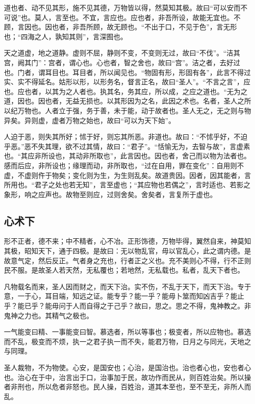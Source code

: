 \documentclass[]{article}
\begin{document}
道也者、动不见其形，施不见其德，万物皆以得，然莫知其极。故曰``可以安而不可说''也。莫人，言至也。不宜，言应也。应也者，非吾所设，故能无宜也。不顾，言因也。因也者，非吾所顾，故无顾也。``不出于口，不见于色''，言无形也；``四海之人，孰知其则''，言深囿也。

天之道虚，地之道静。虚则不屈，静则不变，不变则无过，故曰``不伐''。``洁其宫，阙其门''：宫者，谓心也。心也者，智之舍也，故曰``宫''。洁之者，去好过也。门者，谓耳目也。耳目者，所以闻见也。``物固有形，形固有各''，此言不得过实、实不得延名。姑形以形，以形务名，督言正名，故曰``圣人''。``不言之言''，应也。应也者，以其为之人者也。执其名，务其应，所以成，之应之道也。``无为之道，因也。因也者，无益无损也。以其形因为之名，此因之术也。名者，圣人之所以纪万物也。人者立于强，务于善，未于能，动于故者也。圣人无之，无之则与物异矣。异则虚，虚者万物之始也，故曰``可以为天下始''。

人迫于恶，则失其所好；怵于好，则忘其所恶。非道也。故曰：``不怵乎好，不迫乎恶。''恶不失其理，欲不过其情，故曰：``君子''。``恬愉无为，去智与故''，言虚素也。``其应非所设也，其动非所取也''，此言因也。因也者，舍己而以物为法者也。感而后应，非所设也；缘理而动，非所取也，``过在自用，罪在变化''：自用则不虚，不虚则仵于物矣；变化则为生，为生则乱矣。故道贵因。因者，因其能者，言所用也。``君子之处也若无知''，言至虚也；``其应物也若偶之''，言时适也、若影之象形，响之应声也。故物至则应，过则舍矣。舍矣者，言复所于虚也。

\hypertarget{header-n518}{%
\subsection{心术下}\label{header-n518}}

形不正者，德不来；中不精者，心不冶。正形饰德，万物毕得，翼然自来，神莫知其极，昭知天下，通于四极。是故曰：无以物乱官，毋以官乱心，此之谓内德。是故意气定，然后反正。气者身之充也，行者正之义也。充不美则心不得，行不正则民不服。是故圣人若天然，无私覆也；若地然，无私载也。私者，乱天下者也。

凡物载名而来，圣人因而财之，而天下治。实不伤，不乱于天下，而天下治。专于意，一于心，耳目端，知远之证。能专乎？能一乎？能毋卜筮而知凶吉乎？能止乎？能已乎？能毋问于人而自得之于己乎？故曰，思之。思之不得，鬼神教之。非鬼神之力也。其精气之极也。

一气能变曰精、一事能变曰智。慕选者，所以等事也；极变者，所以应物也。慕选而不乱，极变而不烦，执一之君子执一而不失，能君万物，日月之与同光，天地之与同理。

圣人裁物，不为物使。心安，是国安也；心治，是国治也。治也者心也，安也者心也。治心在于中，治言出于口，治事加于民，故功作而民从，则百姓治矣。所以操者非刑也，所以危者非怒也。民人操，百姓治，道其本至也，至不至无，非所人而乱。
\end{document}
